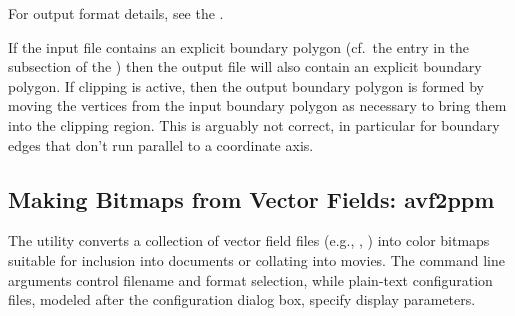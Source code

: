 For output format details, see the .


If the input file contains an explicit boundary polygon (cf.\ the
 entry in the  subsection of the {}) then the
output file will also contain an explicit boundary polygon.  If clipping
is active, then the output boundary polygon is formed by moving the
vertices from the input boundary polygon as necessary to bring them into
the clipping region.  This is arguably not correct, in particular for
boundary edges that don't run parallel to a coordinate axis.



\subsection{Making Bitmaps from Vector Fields:
            avf2ppm}\label{sec:avf2ppm}%
%

The  utility converts a
collection of vector field files (e.g., , ) into color
bitmaps suitable for inclusion into documents or collating into movies.
The command line arguments control filename and format selection, while
plain-text configuration files, modeled after the
{} configuration dialog
box, specify display parameters.

